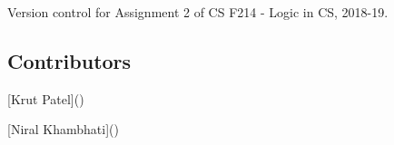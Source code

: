 Version control for Assignment 2 of CS F214 -\/ Logic in CS, 2018-\/19.

\subsection*{Contributors}


\begin{DoxyItemize}
\item \mbox{[}Krut Patel\mbox{]}()
\item \mbox{[}Niral Khambhati\mbox{]}() 
\end{DoxyItemize}